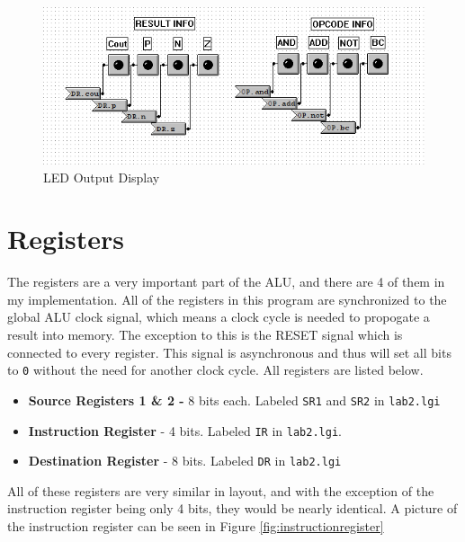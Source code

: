 \documentclass[a4paper,11pt]{article}
\begin{document}
    \begin{figure}[h!]
     \centering
       \includegraphics[width=5in]{pictures/resultinfo}
     \caption{LED Output Display}
     \label{fig:resultinfo}
  \end{figure} 




\section{Registers}
The registers are a very important part of the ALU, and there are 4 of them in my implementation. All of the registers in this program are synchronized to the global ALU clock signal, which means a clock cycle is needed to propogate a result into memory. The exception to this is the RESET signal which is connected to every register. This signal is asynchronous and thus will set all bits to \texttt{0} without the need for another clock cycle. All registers are listed below.
  \begin{itemize}
  \item \textbf{Source Registers 1 \& 2 -} 8 bits each. Labeled \texttt{SR1} and \texttt{SR2} in \texttt{lab2.lgi} 
  \item \textbf{Instruction Register} - 4 bits. Labeled \texttt{IR} in \texttt{lab2.lgi}. 
  \item \textbf{Destination Register} - 8 bits. Labeled \texttt{DR} in \texttt{lab2.lgi}
  \end{itemize}

All of these registers are very similar in layout, and with the exception of the instruction register being only 4 bits, they would be nearly identical. A picture of the instruction register can be seen in Figure \ref{fig:instructionregister}
\end{document}
